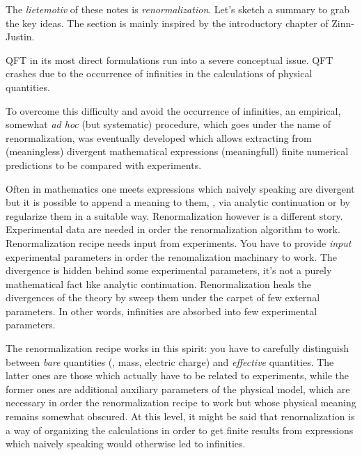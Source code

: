 




The \emph{lietemotiv} of these notes is \emph{renormalization}. Let's sketch a
summary to grab the key
ideas. The section is mainly inspired by the introductory chapter of
Zinn-Justin.

QFT in its most direct formulations run into a severe conceptual
issue.
QFT crashes due to the occurrence of infinities in the calculations of physical
quantities.

To overcome this difficulty and avoid the occurrence of infinities, an empirical, somewhat \emph{ad hoc} (but
systematic) procedure,
which goes under the name of renormalization, was eventually developed which allows extracting from
(meaningless) divergent mathematical expressions
(meaningfull) finite numerical predictions to be compared with experiments.


Often in mathematics one meets expressions which naively speaking are divergent
but it is possible to append a meaning to them, \eg, via analytic continuation or by
regularize them in a suitable way.
Renormalization however is a different story.
Experimental data are needed in order the renormalization algorithm to work.
Renormalization recipe needs input from experiments.
You have to provide \emph{input} experimental parameters in order the
renomalization machinary to work. 
The divergence is hidden behind some experimental parameters, it's not a purely
mathematical fact like analytic continuation.
Renormalization heals the divergences of the theory by sweep them 
under the carpet of few external parameters.
In other words, infinities are absorbed into few experimental parameters.

The renormalization recipe works in this spirit: you have to carefully
distinguish between \emph{bare} quantities (\eg, mass, electric charge) and
\emph{effective}
quantities. The latter ones are those which actually have to be related to
experiments, while the former ones are additional auxiliary parameters of the
physical model, which are necessary in order the renormalization recipe to work
but whose physical meaning remains somewhat obscured.
At this level, it might be said that renornalization is a way of organizing the
calculations in order to get finite results from expressions which naively
speaking would otherwise led to infinities.

